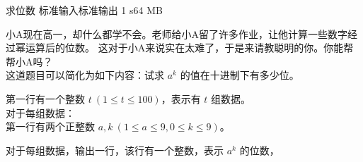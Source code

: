 \gdef\thisproblemauthor{bugaosuni59}
\begin{problem}{求位数}
{标准输入}{标准输出}
{1 s}{64 MB}{}

小A现在高一，却什么都学不会。老师给小A留了许多作业，让他计算一些数字经过幂运算后的位数。
这对于小A来说实在太难了，于是来请教聪明的你。你能帮帮小A吗？\\
这道题目可以简化为如下内容：试求 $a^k$ 的值在十进制下有多少位。

\InputFile

第一行有一个整数 $t\ (1 \le t \le 100)$，表示有 $t$ 组数据。\\
对于每组数据：\\
第一行有两个正整数 $a,k\ (1\le a\le 9,0\le k\le9)$。

\OutputFile

对于每组数据，输出一行，该行有一个整数，表示 $a^k$ 的位数，

\Example

\begin{example}
%
\end{example}

\end{problem}
